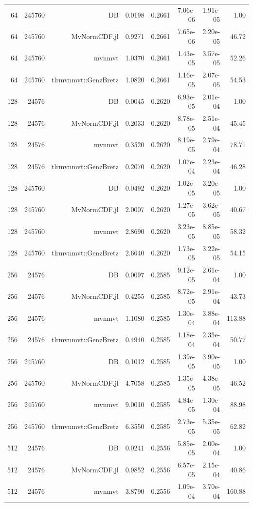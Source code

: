 \begin{tabular}{|r|r|r|r|r|r|r|r|}
  64 & 245760 & DB & 0.0198 & 0.2661 & 7.06e-06 & 1.91e-05 & 1.00 \\
  64 & 245760 & MvNormCDF.jl & 0.9271 & 0.2661 & 7.65e-06 & 2.20e-05 & 46.72 \\
  64 & 245760 & mvnmvt & 1.0370 & 0.2661 & 1.43e-05 & 3.57e-05 & 52.26 \\
  64 & 245760 & tlrmvnmvt::GenzBretz & 1.0820 & 0.2661 & 1.16e-05 & 2.07e-05 & 54.53 \\
  128 & 24576 & DB & 0.0045 & 0.2620 & 6.93e-05 & 2.01e-04 & 1.00 \\
  128 & 24576 & MvNormCDF.jl & 0.2033 & 0.2620 & 8.78e-05 & 2.51e-04 & 45.45 \\
  128 & 24576 & mvnmvt & 0.3520 & 0.2620 & 8.19e-05 & 2.79e-04 & 78.71 \\
  128 & 24576 & tlrmvnmvt::GenzBretz & 0.2070 & 0.2620 & 1.07e-04 & 2.23e-04 & 46.28 \\
  128 & 245760 & DB & 0.0492 & 0.2620 & 1.02e-05 & 3.20e-05 & 1.00 \\
  128 & 245760 & MvNormCDF.jl & 2.0007 & 0.2620 & 1.27e-05 & 3.62e-05 & 40.67 \\
  128 & 245760 & mvnmvt & 2.8690 & 0.2620 & 3.23e-05 & 8.85e-05 & 58.32 \\
  128 & 245760 & tlrmvnmvt::GenzBretz & 2.6640 & 0.2620 & 1.73e-05 & 3.22e-05 & 54.15 \\
  256 & 24576 & DB & 0.0097 & 0.2585 & 9.12e-05 & 2.61e-04 & 1.00 \\
  256 & 24576 & MvNormCDF.jl & 0.4255 & 0.2585 & 8.72e-05 & 2.91e-04 & 43.73 \\
  256 & 24576 & mvnmvt & 1.1080 & 0.2585 & 1.30e-04 & 3.88e-04 & 113.88 \\
  256 & 24576 & tlrmvnmvt::GenzBretz & 0.4940 & 0.2585 & 1.18e-04 & 2.35e-04 & 50.77 \\
  256 & 245760 & DB & 0.1012 & 0.2585 & 1.39e-05 & 3.90e-05 & 1.00 \\
  256 & 245760 & MvNormCDF.jl & 4.7058 & 0.2585 & 1.35e-05 & 4.38e-05 & 46.52 \\
  256 & 245760 & mvnmvt & 9.0010 & 0.2585 & 4.84e-05 & 1.30e-04 & 88.98 \\
  256 & 245760 & tlrmvnmvt::GenzBretz & 6.3550 & 0.2585 & 2.73e-05 & 5.35e-05 & 62.82 \\
  512 & 24576 & DB & 0.0241 & 0.2556 & 5.85e-05 & 2.00e-04 & 1.00 \\
  512 & 24576 & MvNormCDF.jl & 0.9852 & 0.2556 & 6.57e-05 & 2.15e-04 & 40.86 \\
  512 & 24576 & mvnmvt & 3.8790 & 0.2556 & 1.09e-04 & 3.70e-04 & 160.88 \\

\end{tabular}
